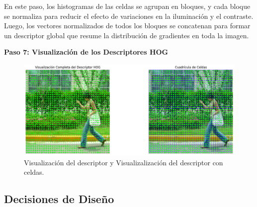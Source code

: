 \documentclass[a4paper]{article}
\begin{document}
En este paso, los histogramas de las celdas se agrupan en bloques, y cada bloque se normaliza para reducir el efecto de variaciones en la iluminación y el contraste. Luego, los vectores normalizados de todos los bloques se concatenan para formar un descriptor global que resume la distribución de gradientes en toda la imagen.
\par\vspace{0.5cm}

\textbf{Paso 7: Visualización de los Descriptores HOG}
\par\vspace{0.5cm}

\begin{figure}[H]
    \centering
    \includegraphics[width=1.0\textwidth]{images/hog_paso_7.png}
    \caption{Visualización del descriptor y Visualizalización del descriptor con celdas.}
\end{figure}

\subsection{Decisiones de Diseño}
\end{document}
